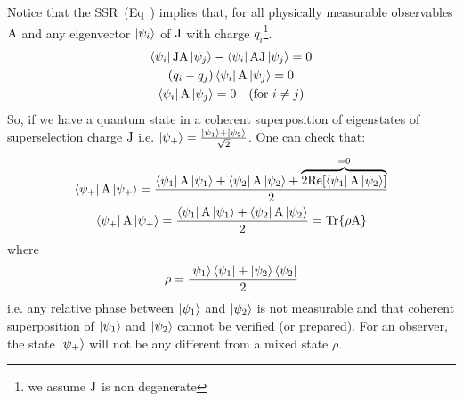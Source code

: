 Notice that the SSR~(Eq~) implies that, for all  physically measurable observables ${\operatorname{A}}$ and  any eigenvector \(\ket{\psi _i}\) of ${\operatorname{J}}$ with charge $q_i$\footnote{we assume ${\operatorname{J}}$ is non degenerate}.
\begin{equation}
	\label{eq:sSSR_orthoganility}
	\begin{gathered}
		\bra{\psi_i}\oper{J}\oper{A}\ket{\psi_j} - \bra{\psi_i}\oper{A}\oper{J}\ket{\psi_j} = 0\\
		(q_i - q_j)\bra{\psi_i}\oper{A}\ket{\psi_j} = 0\\
		\bra{\psi_i}\oper{A}\ket{\psi_j} = 0 \quad (\text{for } i\not = j)
	\end{gathered}
\end{equation}
So,  if we have a quantum state in a coherent superposition of eigenstates of superselection charge ${\operatorname{J}}$ i.e. \(\ket{\psi _+} = \frac{\ket{\psi _1} + \ket{\psi_2}}{\sqrt{2}}\). One can check that:
\begin{equation}
	\begin{gathered}
		\bra{\psi_+}{\operatorname{A}}\ket{\psi_+} =  \frac{\bra{\psi_1}{\operatorname{A}}\ket{\psi_1} +  \bra{\psi_2}{\operatorname{A}}\ket{\psi_2} + \overbrace{2\mathrm{Re}[\bra{\psi_1}{\operatorname{A}}\ket{\psi_2}]}
			^{=0}
		}{2}\\
		\bra{\psi_+}{\operatorname{A}}\ket{\psi_+} =  \frac{\bra{\psi_1}{\operatorname{A}}\ket{\psi_1} +  \bra{\psi_2}{\operatorname{A}}\ket{\psi_2}}{2} = \Tr{\rho {\operatorname{A}}}
	\end{gathered}
\end{equation}
where
\begin{equation}
	\rho = \frac{\ket{\psi_1}\bra{\psi_1} + \ket{\psi_2}\bra{\psi_2}}{2}
\end{equation}
i.e. any relative phase between \(\ket{\psi_1}\) and \(\ket{\psi_2}\) is not measurable 
and that coherent superposition of \(\ket{\psi_1}\) and \(\ket{\psi_2}\) cannot be 
verified (or prepared). For an observer, the state \(\ket{\psi_+}\) will not be any 
different from a mixed state \(\rho\). 